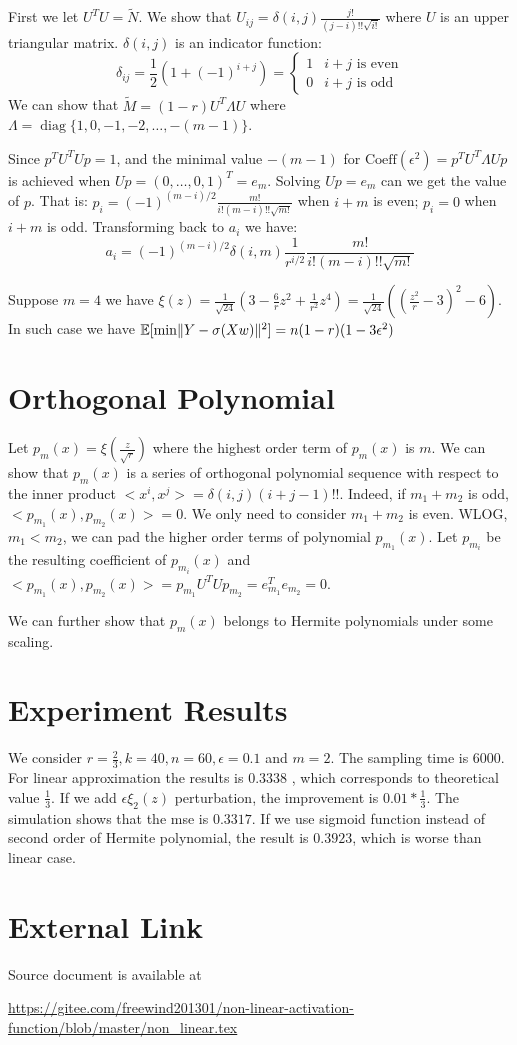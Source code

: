 \documentclass{article}
\DeclarePairedDelimiter\norm{\lVert}{\rVert}
\def\E{\mathbb{E}}
\DeclareMathOperator*{\diag}{diag}
\begin{document}
First we let $U^T U = \widetilde{N}$. We show that $U_{ij} = \delta(i,j)\frac{j!}{(j-i)!!\sqrt{i!}}$ where $U$ is an upper triangular matrix. $\delta(i,j)$ is an indicator function:
\begin{equation}
\delta_{ij} = \frac{1}{2}(1+(-1)^{i+j})=\begin{cases}
1 & i+j \textrm{ is even} \\
0 & i+j \textrm{ is odd}
\end{cases}
\end{equation}
We can show that $\widetilde{M} = (1-r)U^T \Lambda U$ where $\Lambda = \diag\{1,0, -1, -2, \dots, -(m-1)\}$.

Since $p^T U^T U p = 1$, and the minimal value $-(m-1)$ for $\textrm{Coeff}(\epsilon^2) = p^T U^T \Lambda U p $ is achieved when $U p = (0, \dots, 0, 1)^T = e_m$. Solving $ U p = e_m $ can we get the value of $p$. That is: $p_i = (-1)^{(m-i)/2} \frac{m!}{i!(m-i)!! \sqrt{m!}} $ when $i+m$ is even; $p_i = 0 $ when $i+m$ is odd. Transforming back to $a_i$ we have:
\begin{equation}
a_i =(-1)^{(m-i)/2} \delta(i,m) \frac{1}{r^{i/2}} \frac{m!}{i!(m-i)!! \sqrt{m!}}
\end{equation}

Suppose  $ m = 4$ we have $ \xi(z) = \frac{1}{\sqrt{24}}(3 - \frac{6}{r} z^2 + \frac{1}{r^2}z^4)  = \frac{1}{\sqrt{24}}((\frac{z^2}{r} - 3)^2 - 6)$. In such case we have $\E[\min \norm{Y - \sigma(Xw)}^2]=n(1-r)(1-3\epsilon^2)$
\section{Orthogonal Polynomial}
Let $p_m(x) = \xi(\frac{z}{\sqrt{r}})$ where the highest order term of $p_m(x)$ is $m$. We can show that $p_m(x)$ is a series of orthogonal polynomial sequence with respect to the inner product 
$<x^i, x^j> = \delta(i,j)(i+j-1)!!$. Indeed, if $m_1 + m_2$ is odd, $<p_{m_1}(x), p_{m_2}(x)> = 0$.
We only need to consider $m_1 + m_2$ is even. WLOG, $m_1 < m_2$, we can pad the higher order terms of polynomial $p_{m_1}(x)$. Let $p_{m_i}$ be the resulting coefficient of $p_{m_i}(x)$
and $<p_{m_1}(x), p_{m_2}(x)> = p_{m_1}U^TUp_{m_2} = e^T_{m_1} e_{m_2} = 0$.

We can further show that $p_m(x)$ belongs to Hermite polynomials under some scaling.

\section{Experiment Results}
We consider $r=\frac{2}{3}, k=40, n=60, \epsilon=0.1$ and $m=2$. The sampling time is 6000.
For linear approximation the results is $0.3338$ ,  which corresponds to theoretical value $\frac{1}{3}$. 
If we add $\epsilon \xi_2(z)$ perturbation, the improvement is $0.01 * \frac{1}{3}$. The simulation shows that the mse is $0.3317$. If we use sigmoid function instead of second order of Hermite polynomial, the result is $0.3923$, which is worse than linear case.

\section{External Link}
Source document is available at 

\url{https://gitee.com/freewind201301/non-linear-activation-function/blob/master/non_linear.tex}
\end{document}
